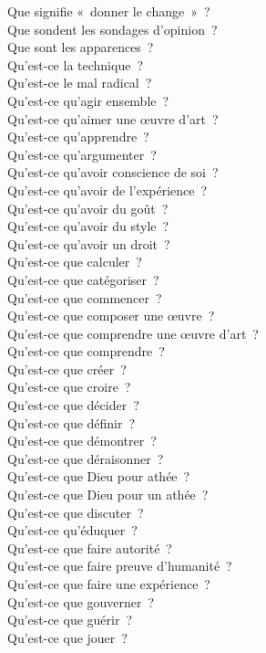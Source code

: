 \documentclass[a4paper,12pt]{article}
\begin{document}
Que signifie « donner le change » ? \\
Que sondent les sondages d'opinion ? \\
Que sont les apparences ? \\
Qu'est-ce la technique ? \\
Qu'est-ce le mal radical ? \\
Qu'est-ce qu'agir ensemble ? \\
Qu'est-ce qu'aimer une œuvre d'art ? \\
Qu'est-ce qu'apprendre ? \\
Qu'est-ce qu'argumenter ? \\
Qu'est-ce qu'avoir conscience de soi ? \\
Qu'est-ce qu'avoir de l'expérience ? \\
Qu'est-ce qu'avoir du goût ? \\
Qu'est-ce qu'avoir du style ? \\
Qu'est-ce qu'avoir un droit ? \\
Qu'est-ce que calculer ? \\
Qu'est-ce que catégoriser ? \\
Qu'est-ce que commencer ? \\
Qu'est-ce que composer une œuvre ? \\
Qu'est-ce que comprendre une œuvre d'art ? \\
Qu'est-ce que comprendre ? \\
Qu'est-ce que créer ? \\
Qu'est-ce que croire ? \\
Qu'est-ce que décider ? \\
Qu'est-ce que définir ? \\
Qu'est-ce que démontrer ? \\
Qu'est-ce que déraisonner ? \\
Qu'est-ce que Dieu pour athée ? \\
Qu'est-ce que Dieu pour un athée ? \\
Qu'est-ce que discuter ? \\
Qu'est-ce qu'éduquer ? \\
Qu'est-ce que faire autorité ? \\
Qu'est-ce que faire preuve d'humanité ? \\
Qu'est-ce que faire une expérience ? \\
Qu'est-ce que gouverner ? \\
Qu'est-ce que guérir ? \\
Qu'est-ce que jouer ? \\
\end{document}
